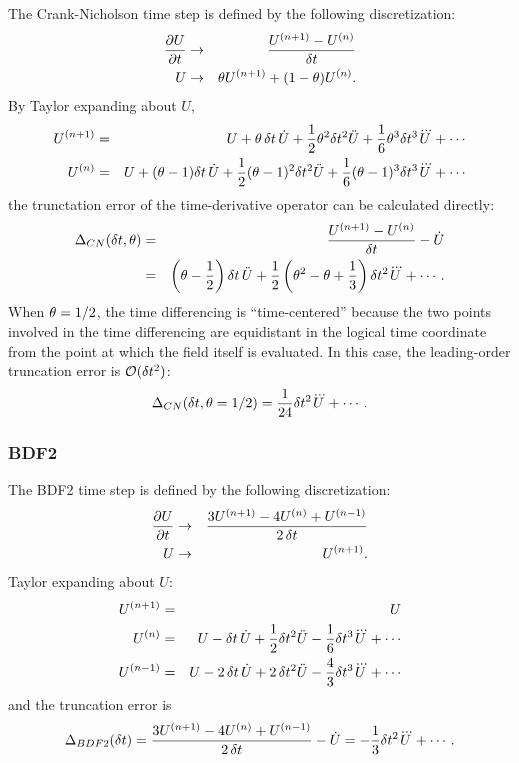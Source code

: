 The Crank-Nicholson time step is defined by the following discretization:
\begin{eqnarray*}
  \frac{\partial U}{\partial t} & \to & 
  \frac{U^{(n+1)} - U^{(n)}}{\delta t}\\
  U & \to & \theta U^{(n+1)} + (1-\theta) U^{(n)}.
\end{eqnarray*}
By Taylor expanding about $U$,
\begin{eqnarray*}
  U^{(n+1)} & = & U + \theta\,\delta t\,\dot{U} + \frac{1}{2} \theta^2 \delta t^2
  \ddot{U} + \frac{1}{6} \theta^3 \delta t^3 \dddot{U}+ \cdots
  \\
  U^{(n)} & = & U + (\theta-1) \delta t\, \dot{U} + \frac{1}{2} (\theta-1)^2 \delta t^2
  \ddot{U} + \frac{1}{6} (\theta-1)^3 \delta t^3 \dddot{U} + \cdots
\end{eqnarray*}
the trunctation error of the time-derivative operator can be
calculated directly:
\begin{eqnarray*}
  \Delta_{CN}(\delta t, \theta) & = & \frac{U^{(n+1)} - U^{(n)}}{\delta t} -
 \dot{U}
 \\ 
 & = & 
  \left( \theta-\frac{1}{2} \right) \delta t\,\ddot{U}
  + \frac{1}{2} \left(\theta^2 - \theta + \frac{1}{3} \right) \delta t^2 \dddot{U}
  + \cdots.
\end{eqnarray*}
When $\theta=1/2$, the time differencing is ``time-centered'' because
the two points involved in the time differencing are equidistant in
the logical time coordinate from the point at which the field itself
is evaluated.  In this case, the leading-order truncation error is
$\mathcal{O}(\delta t^2)$:
\begin{equation}
  \Delta_{CN}(\delta t, \theta=1/2) = \frac{1}{24} \delta t^2 \dddot{U} + \cdots.
\end{equation}

\subsubsection{BDF2}

The BDF2 time step is defined by the following discretization:
\begin{eqnarray*}
  \frac{\partial U}{\partial t} & \to & 
  \frac{3 U^{(n+1)} - 4 U^{(n)} + U^{(n-1)}}{2\,\delta t}\\
  U & \to & U^{(n+1)}.
\end{eqnarray*}
Taylor expanding about $U$:
\begin{eqnarray*}
  U^{(n+1)} & = & U
  \\
  U^{(n)} & = & U - \delta t\, \dot{U} + \frac{1}{2} \delta t^2 \ddot{U} 
  - \frac{1}{6} \delta t^3 \dddot{U} + \cdots
  \\
  U^{(n-1)} & = & U - 2\,\delta t\, \dot{U} + 2\,\delta t^2 \ddot{U} 
  - \frac{4}{3} \delta t^3 \dddot{U} + \cdots
\end{eqnarray*}
and the truncation error is
\begin{equation}
  \Delta_{BDF2}(\delta t) = 
  \frac{3 U^{(n+1)} - 4 U^{(n)} + U^{(n-1)}}{2\,\delta t} - \dot{U} = 
  - \frac{1}{3} \delta t^2 \dddot{U}
  + \cdots.
\end{equation}

